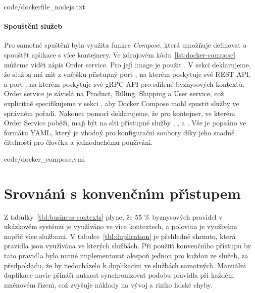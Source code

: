 
{code/dockerfile_nodejs.txt}

\paragraph{Spouštěn\'{\i} služeb}
Pro samotné spuštěn\'{\i} byla využita funkce \textit{Compose}, která umožňuje
definovat a spouštět aplikace s více kontejnery. Ve zdrojovém kódu~\ref{lst:docker-compose}
můžeme vidět zápis Order service. Pro jej\'{\i} image je použit .
V sekci  deklarujeme, že služba má m\'{\i}t z vnějšku př\'{\i}stupn\'y port , na kterém poskytuje své
\gls{REST} \gls{API}, a port , na kterém poskytuje své gRPC \gls{API} pro sd\'{\i}lené byznysov\'ych kontextů. Order service je závislá
na Product, Billing, Shipping a User service, což explicitně specifikujeme v sekci ,
aby Docker Compose mohl spustit služby ve správném pořad\'{\i}. Nakonec pomoc\'{\i}  deklarujeme,
že pro kontejner, ve kterém Order Service poběž\'{\i}, maj\'{\i} b\'yt na s\'{\i}ti př\'{\i}stupné služby , ,
 a . Vše je popsáno ve formátu \gls{YAML}, kter\'y je vhodný
pro konfiguračn\'{\i} soubory díky jeho snadné čitelnosti pro člověka a jednoduchému použ\'{\i}ván\'{\i}.


{code/docker_compose.yml}

\section{Srovnán\'{\i} s konvenčn\'{\i}m př\'{\i}stupem}

Z tabulky~\ref{tbl:business-contexts} plyne, že 55 \% byznysov\'ych pravidel v ukázkovém systému je
využ\'{\i}váno ve v\'{\i}ce kontextech, a polovina je využ\'{\i}vána např\'{\i}č v\'{\i}ce službami.
V tabulce~\ref{tbl:duplication} je přehledně shrnuto, která pravidla jsou využ\'{\i}vána ve kter\'ych službách.
Při použit\'{\i} konvenčn\'{\i}ho př\'{\i}stupu by tato pravidla bylo nutné implementovat alespoň
jednou pro každou ze služeb, za předpokladu, že by nedocházelo k duplikac\'{\i}m ve službách samotn\'ych.
Manuáln\'{\i} duplikace nav\'{\i}c přináš\'{\i} nutnost synchronizovat podobu pravidla při každém změnovém
ř\'{\i}zen\'{\i}, což zvyšuje náklady na v\'yvoj a riziko lidské chyby.

